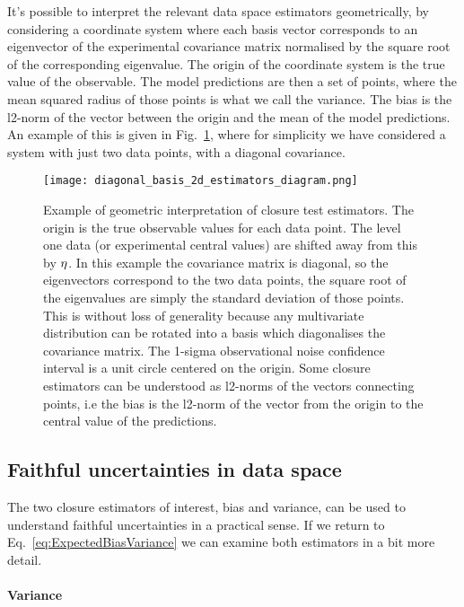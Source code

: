 It's possible to interpret the relevant data space estimators geometrically,
by considering a coordinate system where each basis vector corresponds to
an eigenvector of the experimental covariance matrix normalised by the
square root of the corresponding eigenvalue. The origin of the coordinate system
is the true value of the observable. The model predictions are then a set of
points, where the mean squared radius of those points is what we call the variance.
The bias is the l2-norm of the vector between the origin and the mean of the
model predictions. An example of this is given in Fig.~\ref{fig:diagram2destimators},
where for simplicity we have considered a system with just two data points,
with a diagonal covariance.
%
\begin{figure}
    \centering
    \texttt{[image: diagonal\_basis\_2d\_estimators\_diagram.png]}
    \caption{Example of geometric interpretation of closure test estimators.
    The origin
    is the true observable values for each data point. The level one data (or
    experimental central values) are
    shifted away from this by $\eta$. In this example the covariance matrix
    is diagonal, so the eigenvectors correspond to the two data points, the
    square root of the eigenvalues are simply the standard deviation of those
    points. This is without loss of generality because any multivariate distribution
    can be rotated into a basis which diagonalises the covariance matrix.
    The 1-sigma observational noise confidence interval
    is a unit circle centered on the origin. Some closure
    estimators can be understood as l2-norms of the vectors connecting points,
    i.e the bias is the l2-norm of the vector from the origin to the central
    value of the predictions.}
    \label{fig:diagram2destimators}
\end{figure}
%
\subsection{Faithful uncertainties in data space}

The two closure estimators of interest, bias and variance, can be used to
understand faithful uncertainties in a practical sense. If we return to
Eq.~\ref{eq:ExpectedBiasVariance} we can examine both estimators in a bit
more detail.

\paragraph{Variance}

